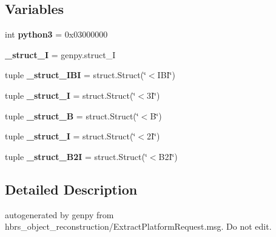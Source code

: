 \subsection*{\-Variables}
\begin{DoxyCompactItemize}
\item 
\hypertarget{namespacehbrs__object__reconstruction_1_1srv_1_1___extract_platform_aafa500ed1c321b4a5ef9d4ffac4708c9}{int {\bfseries python3} = 0x03000000}\label{namespacehbrs__object__reconstruction_1_1srv_1_1___extract_platform_aafa500ed1c321b4a5ef9d4ffac4708c9}

\item 
\hypertarget{namespacehbrs__object__reconstruction_1_1srv_1_1___extract_platform_abaa32dbafcd48332125e047bae750105}{{\bfseries \-\_\-struct\-\_\-\-I} = genpy.\-struct\-\_\-\-I}\label{namespacehbrs__object__reconstruction_1_1srv_1_1___extract_platform_abaa32dbafcd48332125e047bae750105}

\item 
\hypertarget{namespacehbrs__object__reconstruction_1_1srv_1_1___extract_platform_a54f36a69463c7e104c735c3da70d1a83}{tuple {\bfseries \-\_\-struct\-\_\-\-I\-B\-I} = struct.\-Struct(\char`\"{}$<$\-I\-B\-I\char`\"{})}\label{namespacehbrs__object__reconstruction_1_1srv_1_1___extract_platform_a54f36a69463c7e104c735c3da70d1a83}

\item 
\hypertarget{namespacehbrs__object__reconstruction_1_1srv_1_1___extract_platform_aa3b747786f9580557fcc9fb258e275b6}{tuple {\bfseries \-\_\-struct\-\_\-I} = struct.\-Struct(\char`\"{}$<$3\-I\char`\"{})}\label{namespacehbrs__object__reconstruction_1_1srv_1_1___extract_platform_aa3b747786f9580557fcc9fb258e275b6}

\item 
\hypertarget{namespacehbrs__object__reconstruction_1_1srv_1_1___extract_platform_a1807926cdc8c8ba45de2fac184cac30e}{tuple {\bfseries \-\_\-struct\-\_\-\-B} = struct.\-Struct(\char`\"{}$<$\-B\char`\"{})}\label{namespacehbrs__object__reconstruction_1_1srv_1_1___extract_platform_a1807926cdc8c8ba45de2fac184cac30e}

\item 
\hypertarget{namespacehbrs__object__reconstruction_1_1srv_1_1___extract_platform_a3fb8827dbb99d3d0c44487fa4448d7fa}{tuple {\bfseries \-\_\-struct\-\_\-I} = struct.\-Struct(\char`\"{}$<$2\-I\char`\"{})}\label{namespacehbrs__object__reconstruction_1_1srv_1_1___extract_platform_a3fb8827dbb99d3d0c44487fa4448d7fa}

\item 
\hypertarget{namespacehbrs__object__reconstruction_1_1srv_1_1___extract_platform_a7bce26cd8f2e5041c28650b9f4baad54}{tuple {\bfseries \-\_\-struct\-\_\-\-B2\-I} = struct.\-Struct(\char`\"{}$<$\-B2\-I\char`\"{})}\label{namespacehbrs__object__reconstruction_1_1srv_1_1___extract_platform_a7bce26cd8f2e5041c28650b9f4baad54}

\end{DoxyCompactItemize}


\subsection{\-Detailed \-Description}
\begin{DoxyVerb}autogenerated by genpy from hbrs_object_reconstruction/ExtractPlatformRequest.msg. Do not edit.\end{DoxyVerb}
 